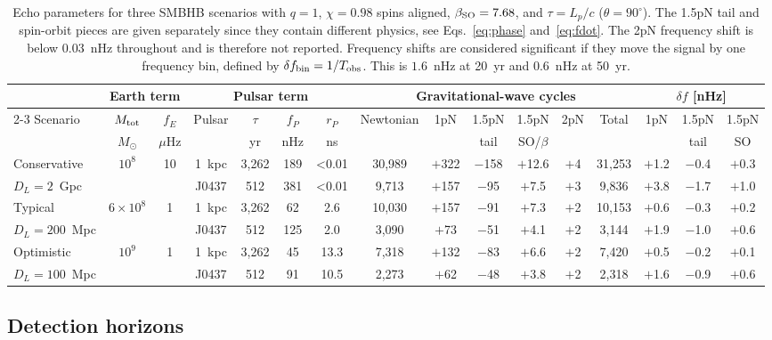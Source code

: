 \documentclass[aps,prx,twocolumn,superscriptaddress,nofootinbib,longbibliography]{revtex4-2}
\newcommand{\Msun}{M_\odot}
\begin{document}
\begin{table}[t]
\caption{Echo parameters for three SMBHB scenarios with $q=1$, $\chi=0.98$ spins aligned, $\beta_{\rm SO}=7.68$, and $\tau=L_p/c$ ($\theta=90^\circ$). The 1.5pN tail and spin-orbit pieces are given separately since they contain different physics, see Eqs.~\eqref{eq:phase} and~\eqref{eq:fdot}. The 2pN frequency shift is below $0.03$~nHz throughout and is therefore not reported. Frequency shifts are considered significant if they move the signal by one frequency bin, defined by $\delta f_{\rm bin}=1/T_{\rm obs}$. This is $1.6$~nHz at 20~yr and $0.6$~nHz at 50~yr.}
\label{tab:scenarios}
\centering
\setlength{\tabcolsep}{2pt}
\begin{tabular}{lccccccccccccccc}
\hline\hline
 & \multicolumn{2}{c}{Earth term} &
   \multicolumn{4}{c}{Pulsar term} &
   \multicolumn{6}{c}{Gravitational-wave cycles} &
   \multicolumn{3}{c}{$\delta f$ [nHz]} \\
\cline{2-3}\cline{4-7}\cline{8-13}\cline{14-16}
Scenario & $M_{\rm tot}$ & $f_E$ & Pulsar & $\tau$  & $f_P$ & $r_P$ & Newtonian & 1pN & 1.5pN & 1.5pN & 2pN & Total & 1pN & 1.5pN & 1.5pN \\
 & $\Msun$& $\mu$Hz & & yr & nHz & ns & & & tail & SO/$\beta$ & & & & tail & SO \\
\hline
Conservative & $10^8$ & 10 & 1~kpc & 3{,}262 & 189 & <0.01 & 30{,}989 & $+$322 & $-$158 & $+$12.6 & $+$4 & 31{,}253 & $+$1.2 & $-$0.4 & $+$0.3 \\
$D_L\!=\!2$~Gpc & & & J0437 & 512 & 381 & <0.01 & 9{,}713 & $+$157 & $-$95 & $+$7.5 & $+$3 & 9{,}836 & $+$3.8 & $-$1.7 & $+$1.0 \\[3pt]
Typical & $6\!\times\!10^8$ & 1 & 1~kpc & 3{,}262 & 62 & 2.6 & 10{,}030 & $+$157 & $-$91 & $+$7.3 & $+$2 & 10{,}153 & $+$0.6 & $-$0.3 & $+$0.2 \\
$D_L\!=\!200$~Mpc & & & J0437 & 512 & 125 & 2.0 & 3{,}090 & $+$73 & $-$51 & $+$4.1 & $+$2 & 3{,}144 & $+$1.9 & $-$1.0 & $+$0.6 \\[3pt]
Optimistic & $10^9$ & 1 & 1~kpc & 3{,}262 & 45 & 13.3 & 7{,}318 & $+$132 & $-$83 & $+$6.6 & $+$2 & 7{,}420 & $+$0.5 & $-$0.2 & $+$0.1 \\
$D_L\!=\!100$~Mpc & & & J0437 & 512 & 91 & 10.5 & 2{,}273 & $+$62 & $-$48 & $+$3.8 & $+$2 & 2{,}318 & $+$1.6 & $-$0.9 & $+$0.6 \\
\hline\hline
\end{tabular}
\end{table}

\subsection{Detection horizons}\label{sec:horizon}
\end{document}
